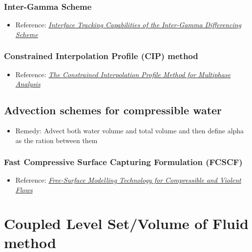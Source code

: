 \subsubsection{Inter-Gamma Scheme}

\begin{itemize}
    \item Reference: \textit{\href{http://powerlab.fsb.hr/ped/kturbo/openfoam/docs/InterTrack.pdf}{Interface Tracking Capabilities of the Inter-Gamma Differencing Scheme}}
\end{itemize}

\subsubsection{Constrained Interpolation Profile (CIP) method}


\begin{itemize}
    \item Reference: \textit{\href{http://www.mech.titech.ac.jp/~ryuutai/paper/JCP2001CIPReviewYabe.pdf}{The Constrained Interpolation Profile Method for Multiphase Analysis}}
\end{itemize}

\subsection{Advection schemes for compressible water}

\begin{itemize}
    \item Remedy: Advect both water volume and total volume and then define alpha as the ration between them
\end{itemize}

\subsubsection{Fast Compressive Surface Capturing Formulation (FCSCF)}

\begin{itemize}
    \item Reference: \textit{\href{http://researchspace.csir.co.za/dspace/bitstream/10204/5282/1/Heyns_2011.pdf}{Free-Surface Modelling Technology for Compressible and Violent Flows}}
\end{itemize}

\section{Coupled Level Set/Volume of Fluid  method}

